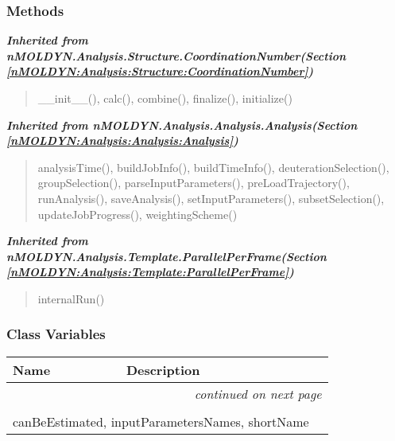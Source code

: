 
  \subsubsection{Methods}


\large{\textbf{\textit{Inherited from nMOLDYN.Analysis.Structure.CoordinationNumber\textit{(Section \ref{nMOLDYN:Analysis:Structure:CoordinationNumber})}}}}

\begin{quote}
\_\_init\_\_(), calc(), combine(), finalize(), initialize()
\end{quote}

\large{\textbf{\textit{Inherited from nMOLDYN.Analysis.Analysis.Analysis\textit{(Section \ref{nMOLDYN:Analysis:Analysis:Analysis})}}}}

\begin{quote}
analysisTime(), buildJobInfo(), buildTimeInfo(), deuterationSelection(), groupSelection(), parseInputParameters(), preLoadTrajectory(), runAnalysis(), saveAnalysis(), setInputParameters(), subsetSelection(), updateJobProgress(), weightingScheme()
\end{quote}

\large{\textbf{\textit{Inherited from nMOLDYN.Analysis.Template.ParallelPerFrame\textit{(Section \ref{nMOLDYN:Analysis:Template:ParallelPerFrame})}}}}

\begin{quote}
internalRun()
\end{quote}


  \subsubsection{Class Variables}

    \vspace{-1cm}
\hspace{\varindent}\begin{longtable}{|p{\varnamewidth}|p{\vardescrwidth}|l}
\cline{1-2}
\cline{1-2} \centering \textbf{Name} & \centering \textbf{Description}& \\
\cline{1-2}
\endhead\cline{1-2}\multicolumn{3}{r}{\small\textit{continued on next page}}\\\endfoot\cline{1-2}
\endlastfoot\multicolumn{2}{|l|}{\textit{Inherited from nMOLDYN.Analysis.Structure.CoordinationNumber \textit{(Section \ref{nMOLDYN:Analysis:Structure:CoordinationNumber})}}}\\
\multicolumn{2}{|p{\varwidth}|}{\raggedright canBeEstimated, inputParametersNames, shortName}\\
\cline{1-2}
\end{longtable}

